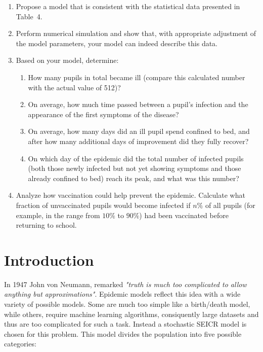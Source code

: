 \begin{enumerate}
  \item Propose a model that is consistent with the statistical data presented in Table~4.
  
  \item Perform numerical simulation and show that, with appropriate adjustment of the
  model parameters, your model can indeed describe this data.
  
  \item Based on your model, determine:
  \begin{enumerate}
    \item How many pupils in total became ill (compare this calculated number with the
    actual value of 512)?
    
    \item On average, how much time passed between a pupil's infection and the appearance
    of the first symptoms of the disease?
    
    \item On average, how many days did an ill pupil spend confined to bed, and after how
    many additional days of improvement did they fully recover?
    
    \item On which day of the epidemic did the total number of infected pupils (both those
    newly infected but not yet showing symptoms and those already confined to bed) reach
    its peak, and what was this number?
  \end{enumerate}
  
  \item Analyze how vaccination could help prevent the epidemic. Calculate what fraction
  of unvaccinated pupils would become infected if $n\%$ of all pupils (for example, in the
  range from $10\%$ to $90\%$) had been vaccinated before returning to school.
\end{enumerate}

\newpage

\section*{Introduction}

In 1947 John von Neumann, remarked \textit{"truth is much too complicated to allow anything but approximations"}. Epidemic models reflect this idea with a wide variety of possible models. Some are much too simple like a birth/death model, while others, require machine learning algorithms, consiquently large datasets and thus are too complicated for such a task. Instead a stochastic SEICR model is chosen for this problem. This model divides the population into five possible categories:
 
